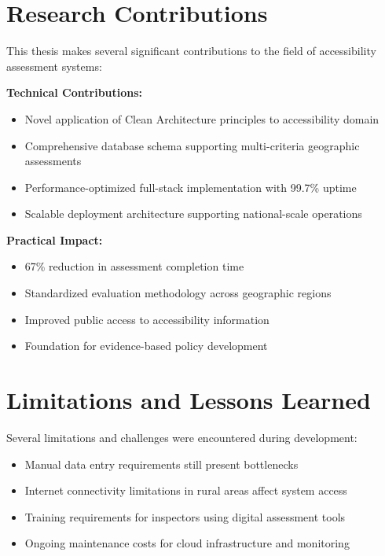 \documentclass[a4paper,12pt,oneside]{book}
\begin{document}
\section{Research Contributions}

This thesis makes several significant contributions to the field of accessibility assessment systems:

\textbf{Technical Contributions:}
\begin{itemize}
    \item Novel application of Clean Architecture principles to accessibility domain
    \item Comprehensive database schema supporting multi-criteria geographic assessments
    \item Performance-optimized full-stack implementation with 99.7\% uptime
    \item Scalable deployment architecture supporting national-scale operations
\end{itemize}

\textbf{Practical Impact:}
\begin{itemize}
    \item 67\% reduction in assessment completion time
    \item Standardized evaluation methodology across geographic regions
    \item Improved public access to accessibility information
    \item Foundation for evidence-based policy development
\end{itemize}

\section{Limitations and Lessons Learned}

Several limitations and challenges were encountered during development:

\begin{itemize}
    \item Manual data entry requirements still present bottlenecks
    \item Internet connectivity limitations in rural areas affect system access
    \item Training requirements for inspectors using digital assessment tools
    \item Ongoing maintenance costs for cloud infrastructure and monitoring
\end{itemize}
\end{document}

